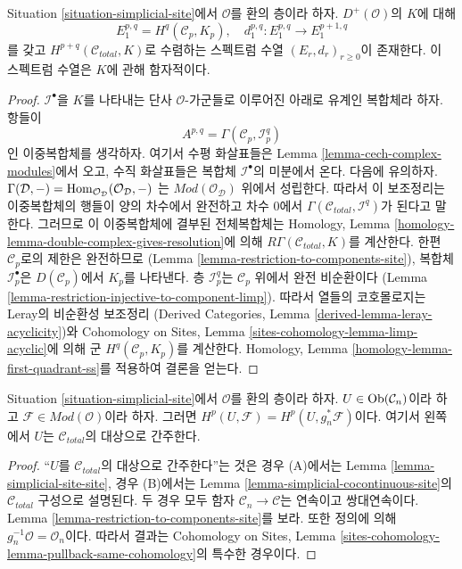 \begin{lemma}
\label{lemma-simplicial-module-cohomology-site}
Situation \ref{situation-simplicial-site}에서 $\mathcal{O}$를 환의 층이라 하자.
$D^+(\mathcal{O})$의 $K$에 대해
$$
E_1^{p, q} = H^q(\mathcal{C}_p, K_p),\quad
d_1^{p, q} : E_1^{p, q} \to E_1^{p + 1, q}
$$
를 갖고 $H^{p + q}(\mathcal{C}_{total}, K)$로 수렴하는 스펙트럼 수열
$(E_r, d_r)_{r \geq 0}$이 존재한다.
이 스펙트럼 수열은 $K$에 관해 함자적이다.
\end{lemma}

\begin{proof}
$\mathcal{I}^\bullet$을 $K$를 나타내는 단사 $\mathcal{O}$-가군들로
이루어진 아래로 유계인 복합체라 하자. 항들이
$$
A^{p, q} = \Gamma(\mathcal{C}_p, \mathcal{I}^q_p)
$$
인 이중복합체를 생각하자. 여기서 수평 화살표들은
Lemma \ref{lemma-cech-complex-modules}에서 오고,
수직 화살표들은 복합체 $\mathcal{I}^\bullet$의 미분에서 온다.
다음에 유의하자.
$\Gamma(\mathcal{D}, -) =
\mathop{\mathrm{Hom}}\nolimits_{\mathcal{O}_\mathcal{D}}(\mathcal{O}_\mathcal{D}, -)$
는 $\textit{Mod}(\mathcal{O}_\mathcal{D})$ 위에서 성립한다.
따라서 이 보조정리는 이중복합체의 행들이 양의 차수에서 완전하고
차수 $0$에서 $\Gamma(\mathcal{C}_{total}, \mathcal{I}^q)$가
된다고 말한다. 그러므로 이 이중복합체에 결부된 전체복합체는
Homology, Lemma \ref{homology-lemma-double-complex-gives-resolution}에 의해
$R\Gamma(\mathcal{C}_{total}, K)$를 계산한다.
한편 $\mathcal{C}_p$로의 제한은 완전하므로
(Lemma \ref{lemma-restriction-to-components-site}),
복합체 $\mathcal{I}_p^\bullet$은 $D(\mathcal{C}_p)$에서 $K_p$를 나타낸다.
층 $\mathcal{I}_p^q$는 $\mathcal{C}_p$ 위에서 완전 비순환이다
(Lemma \ref{lemma-restriction-injective-to-component-limp}).
따라서 열들의 코호몰로지는 Leray의 비순환성 보조정리
(Derived Categories, Lemma \ref{derived-lemma-leray-acyclicity})와
Cohomology on Sites, Lemma \ref{sites-cohomology-lemma-limp-acyclic}에 의해
군 $H^q(\mathcal{C}_p, K_p)$를 계산한다.
Homology, Lemma \ref{homology-lemma-first-quadrant-ss}를 적용하여
결론을 얻는다.
\end{proof}

\begin{lemma}
\label{lemma-sanity-check-modules}
Situation \ref{situation-simplicial-site}에서 $\mathcal{O}$를 환의 층이라 하자.
$U \in \mathop{\mathrm{Ob}}\nolimits(\mathcal{C}_n)$이라 하고
$\mathcal{F} \in \textit{Mod}(\mathcal{O})$이라 하자.
그러면 $H^p(U, \mathcal{F}) = H^p(U, g_n^*\mathcal{F})$이다.
여기서 왼쪽에서 $U$는 $\mathcal{C}_{total}$의 대상으로 간주한다.
\end{lemma}

\begin{proof}
“$U$를 $\mathcal{C}_{total}$의 대상으로 간주한다”는 것은
경우 (A)에서는 Lemma \ref{lemma-simplicial-site-site}, 경우 (B)에서는
Lemma \ref{lemma-simplicial-cocontinuous-site}의
$\mathcal{C}_{total}$ 구성으로 설명된다. 두 경우 모두
함자 $\mathcal{C}_n \to \mathcal{C}$는 연속이고 쌍대연속이다.
Lemma \ref{lemma-restriction-to-components-site}를 보라.
또한 정의에 의해 $g_n^{-1}\mathcal{O} = \mathcal{O}_n$이다.
따라서 결과는 Cohomology on Sites, Lemma
\ref{sites-cohomology-lemma-pullback-same-cohomology}의 특수한 경우이다.
\end{proof}
 
